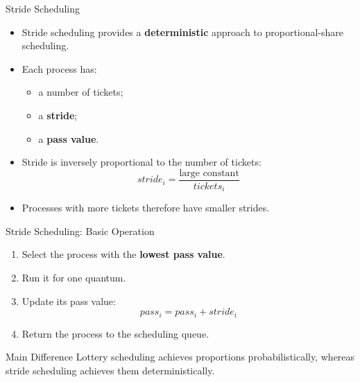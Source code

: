 \begin{frame}{Stride Scheduling}
    \begin{itemize}
        \item Stride scheduling provides a \textbf{deterministic} approach
        to proportional-share scheduling.
        \item Each process has:
        \begin{itemize}
            \item a number of tickets;
            \item a \textbf{stride};
            \item a \textbf{pass value}.
        \end{itemize}

        \item Stride is inversely proportional to the number of tickets:
        \[
            stride_i = \frac{\text{large constant}}{tickets_i}
        \]

        \item Processes with more tickets therefore have smaller strides.
    \end{itemize}
\end{frame}


\begin{frame}{Stride Scheduling: Basic Operation}
    \begin{enumerate}
        \item Select the process with the \textbf{lowest pass value}.
        \item Run it for one quantum.
        \item Update its pass value:
        \[
            pass_i = pass_i + stride_i
        \]
        \item Return the process to the scheduling queue.
    \end{enumerate}

    \begin{block}{Main Difference}
        Lottery scheduling achieves proportions probabilistically,
        whereas stride scheduling achieves them deterministically.
    \end{block}
\end{frame}


